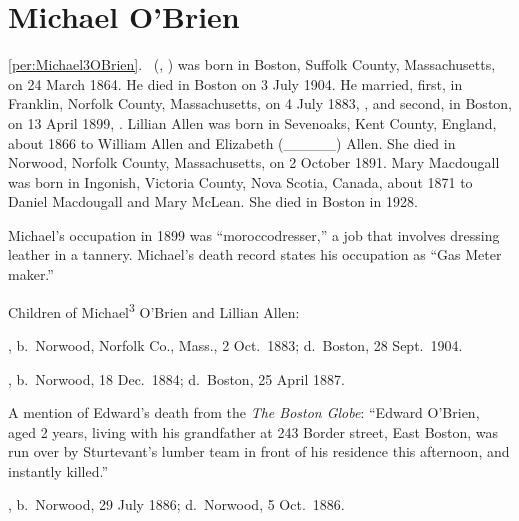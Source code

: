 \section{Michael O'Brien}

\ref{per:Michael3OBrien}.\  (, ) was born in Boston, Suffolk County, Massachusetts, on 24 March 1864.\cite{Michael3OBrienBirth} He died in Boston on 3 July 1904.\cite{Michael3OBrienBirth} He married, first, in Franklin, Norfolk County, Massachusetts, on 4 July 1883, ,\cite{LillianAllenMarriage} and second, in Boston, on 13 April 1899, .\cite{MaryMacdougallMarriage} Lillian Allen was born in Sevenoaks, Kent County, England, about 1866 to William Allen and Elizabeth (\_\_\_\_\_) Allen.\cite{LillianAllenMarriage} She died in Norwood, Norfolk County, Massachusetts, on 2 October 1891.\cite{LillianAllenDeath} Mary Macdougall was born in Ingonish, Victoria County, Nova Scotia, Canada, about 1871 to Daniel Macdougall and Mary McLean.\cite{MaryMacdougallMarriage} She died in Boston in 1928.\cite{MaryMacdougallDeath}

Michael's occupation in 1899 was ``moroccodresser,''\cite{MaryMacdougallMarriage} a job that involves dressing leather in a tannery.\cite{moroccodresser} Michael's death record states his occupation as ``Gas Meter maker.''\cite{Michael3OBrienDeath} 

\begin{KidsIntro}
	Children of Michael\textsuperscript{3} O'Brien and Lillian Allen:
\end{KidsIntro}

\begin{Kids}
	
	, b.\ Norwood, Norfolk Co., Mass., 2 Oct.\ 1883;\cite{Arthur4OBrienBirth} d.\ Boston, 28 Sept.\ 1904.\cite{Arthur4OBrienDeath}
	
	, b.\ Norwood, 18 Dec.\ 1884;\cite{Edward4OBrienBirth} d.\ Boston, 25 April 1887.\cite{Edward4OBrienDeath}
	
	\begin{KidsMoreText}
		A mention of Edward's death from the \textit{The Boston Globe}: ``Edward O'Brien, aged 2 years, living with his grandfather at 243 Border street, East Boston, was run over by Sturtevant's lumber team in front of his residence this afternoon, and instantly killed.''\cite{Edward4OBrienDeath2}
	\end{KidsMoreText}
	
	, b.\ Norwood, 29 July 1886;\cite{Elizabeth4OBrienBirth} d.\ Norwood, 5 Oct.\ 1886.\cite{Elizabeth4OBrienDeath}
	
\end{Kids}

